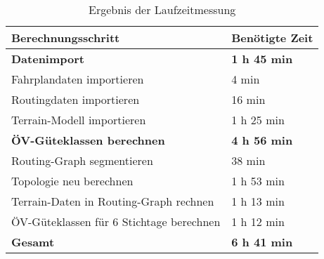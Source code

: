\begin{table}[H]
    \centering
    \begin{tabular}[H]{l l}
        \toprule
        \textbf{Berechnungsschritt}
                                & \textbf{Benötigte Zeit}\\
        \midrule
        \textbf{Datenimport}
                                & \textbf{1 h 45 min} \\
        \hspace{3mm} Fahrplandaten importieren
                                & \hspace{3mm} 4 min \\
        \hspace{3mm} Routingdaten importieren
                                & \hspace{3mm} 16 min \\
        \hspace{3mm} Terrain-Modell importieren
                                & \hspace{3mm} 1 h 25 min \\
        \midrule
        \textbf{\acs{ÖV}-Güteklassen berechnen}
                                & \textbf{4 h 56 min} \\
        \hspace{3mm} Routing-Graph segmentieren
                                & \hspace{3mm} 38 min \\
        \hspace{3mm} Topologie neu berechnen
                                & \hspace{3mm} 1 h 53 min \\
        \hspace{3mm} Terrain-Daten in Routing-Graph rechnen
                                & \hspace{3mm} 1 h 13 min \\
        \hspace{3mm} \acs{ÖV}-Güteklassen für 6 Stichtage berechnen
                                & \hspace{3mm} 1 h 12 min \\
        \midrule
        \textbf{Gesamt}
                                & \textbf{6 h 41 min} \\
        \bottomrule
    \end{tabular}
    \caption{Ergebnis der Laufzeitmessung}
    \label{table:Ergebnis_Laufzeitmessung}
\end{table}


